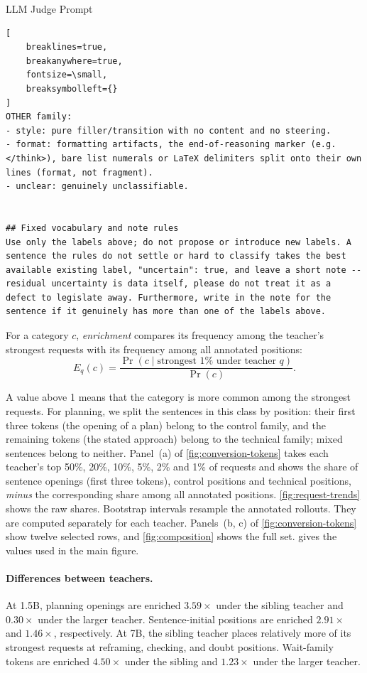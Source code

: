 \begin{promptbox}{LLM Judge Prompt}
\begin{Verbatim}[
    breaklines=true,
    breakanywhere=true,
    fontsize=\small,
    breaksymbolleft={}
]
OTHER family:
- style: pure filler/transition with no content and no steering.
- format: formatting artifacts, the end-of-reasoning marker (e.g. </think>), bare list numerals or LaTeX delimiters split onto their own lines (format, not fragment).
- unclear: genuinely unclassifiable.


## Fixed vocabulary and note rules
Use only the labels above; do not propose or introduce new labels. A sentence the rules do not settle or hard to classify takes the best available existing label, "uncertain": true, and leave a short note -- residual uncertainty is data itself, please do not treat it as a defect to legislate away. Furthermore, write in the note for the sentence if it genuinely has more than one of the labels above.
\end{Verbatim}
\end{promptbox}


For a category $c$, \emph{enrichment} compares its frequency among the teacher's strongest requests with its frequency among all annotated positions:
\[
 E_q(c)=\frac{\Pr(c\mid\text{strongest }1\%\text{ under teacher }q)}{\Pr(c)}.
\]

A value above 1 means that the category is more common among the strongest requests. For planning, we split the sentences in this class by position: their first three tokens (the opening of a plan) belong to the control family, and the remaining tokens (the stated approach) belong to the technical family; mixed sentences belong to neither. Panel~(a) of \cref{fig:conversion-tokens} takes each teacher's top 50\%, 20\%, 10\%, 5\%, 2\% and 1\% of requests and shows the share of sentence openings (first three tokens), control positions and technical positions, \emph{minus} the corresponding share among all annotated positions. \cref{fig:request-trends} shows the raw shares. Bootstrap intervals resample the annotated rollouts. They are computed separately for each teacher. Panels~(b, c) of \cref{fig:conversion-tokens} show twelve selected rows, and \cref{fig:composition} shows the full set.  gives the values used in the main figure.

\paragraph{Differences between teachers.}
At 1.5B, planning openings are enriched $3.59\times$ under the sibling teacher and $0.30\times$ under the larger teacher. Sentence-initial positions are enriched $2.91\times$ and $1.46\times$, respectively. At 7B, the sibling teacher places relatively more of its strongest requests at reframing, checking, and doubt positions. Wait-family tokens are enriched $4.50\times$ under the sibling and $1.23\times$ under the larger teacher.

